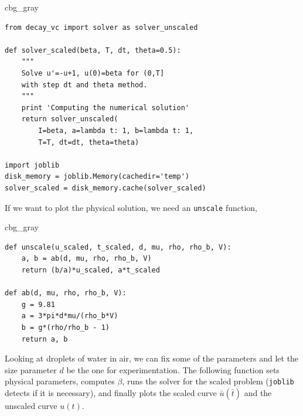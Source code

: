 \documentclass[graybox,envcountchap,sectrefs,final]{svmonodo}
\newenvironment{_cod_tight}[1]{
   \def\FrameCommand{\colorbox{#1}}
   \FrameRule0.6pt\MakeFramed {\FrameRestore}\vskip3mm}
   {\vskip0mm\endMakeFramed}
\newenvironment{cod}[1]{
\bgroup\rmfamily
\fboxsep=0mm\relax
\begin{_cod_tight}{#1}
\list{}{\parsep=-2mm\parskip=0mm\topsep=0pt\leftmargin=2mm
\rightmargin=2\leftmargin\leftmargin=4pt\relax}
\item\relax}
{\endlist\end{_cod_tight}\egroup}
\begin{document}
\begin{cod}{cbg_gray}\begin{Verbatim}[numbers=none,fontsize=\fontsize{9pt}{9pt},baselinestretch=0.95,xleftmargin=2mm]
from decay_vc import solver as solver_unscaled

def solver_scaled(beta, T, dt, theta=0.5):
    """
    Solve u'=-u+1, u(0)=beta for (0,T]
    with step dt and theta method.
    """
    print 'Computing the numerical solution'
    return solver_unscaled(
        I=beta, a=lambda t: 1, b=lambda t: 1,
        T=T, dt=dt, theta=theta)

import joblib
disk_memory = joblib.Memory(cachedir='temp')
solver_scaled = disk_memory.cache(solver_scaled)
\end{Verbatim}
\end{cod}
\noindent
If we want to plot the physical solution, we need an \texttt{unscale} function,

\begin{cod}{cbg_gray}\begin{Verbatim}[numbers=none,fontsize=\fontsize{9pt}{9pt},baselinestretch=0.95,xleftmargin=2mm]
def unscale(u_scaled, t_scaled, d, mu, rho, rho_b, V):
    a, b = ab(d, mu, rho, rho_b, V)
    return (b/a)*u_scaled, a*t_scaled

def ab(d, mu, rho, rho_b, V):
    g = 9.81
    a = 3*pi*d*mu/(rho_b*V)
    b = g*(rho/rho_b - 1)
    return a, b
\end{Verbatim}
\end{cod}
\noindent

Looking at droplets of water in air, we can fix some of the parameters
and let the size parameter $d$ be the one for experimentation.
The following function sets physical parameters, computes $\beta$,
runs the solver for the scaled problem (\texttt{joblib} detects
if it is necessary), and finally plots the scaled curve
$\bar u(\bar t)$ and the unscaled curve $u(t)$.
\end{document}
